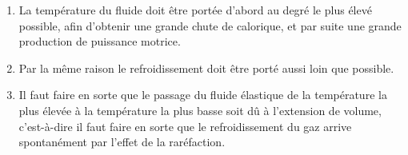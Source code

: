 \documentclass[french,twoside]{book} %
\begin{document}
\begin{enumerate}[itemsep=0pt,topsep=0pt,partopsep=0pt,parskip=0pt]
\item La température du fluide doit être portée d’abord au degré le plus élevé possible, afin d’obtenir une grande chute de calorique, et par suite une grande production de puissance motrice.
\item Par la même raison le refroidissement doit être porté aussi loin que possible.
\item Il faut faire en sorte que le passage du fluide élastique de la température la plus élevée à la température la plus basse soit dû à l’extension de volume, c’est-à-dire il faut faire en sorte que le refroidissement du gaz arrive spontanément par l’effet de la raréfaction.
\end{enumerate}
\end{document}
